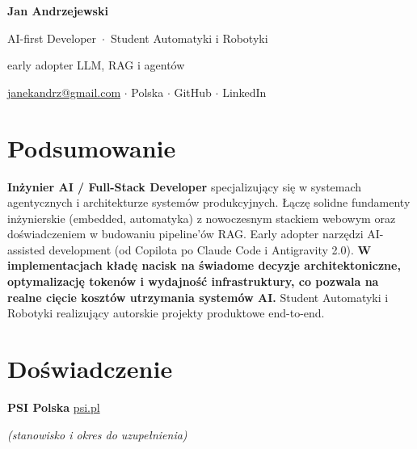 \documentclass[11pt,a4paper]{article}
\begin{document}
\begin{center}
  {\Huge\bfseries Jan Andrzejewski}\par
  \vspace{4pt}
  {\large\color{accent} AI-first Developer \,$\cdot$\, Student Automatyki i Robotyki}\par
  \vspace{2pt}
  {\small\color{muted} early adopter LLM, RAG i agentów}\par
  \vspace{6pt}
  {\small
    \href{mailto:janekandrz@gmail.com}{janekandrz@gmail.com}
    \;$\cdot$\; Polska
    \;$\cdot$\; GitHub
    \;$\cdot$\; LinkedIn
  }
\end{center}

\section*{Podsumowanie}

\textbf{Inżynier AI / Full-Stack Developer} specjalizujący się w systemach agentycznych
i architekturze systemów produkcyjnych. Łączę solidne fundamenty inżynierskie
(embedded, automatyka) z nowoczesnym stackiem webowym oraz doświadczeniem
w budowaniu pipeline'ów RAG. Early adopter narzędzi AI-assisted development
(od Copilota po Claude Code i Antigravity 2.0). \textbf{W implementacjach kładę
nacisk na świadome decyzje architektoniczne, optymalizację tokenów i wydajność
infrastruktury, co pozwala na realne cięcie kosztów utrzymania systemów AI.}
Student Automatyki i Robotyki realizujący autorskie projekty produktowe end-to-end.

\section*{Doświadczenie}

\noindent\textbf{PSI Polska} \hfill {\small\color{muted}\href{https://psi.pl}{psi.pl}}\par
\textit{\small(stanowisko i okres do uzupełnienia)}

\end{document}
